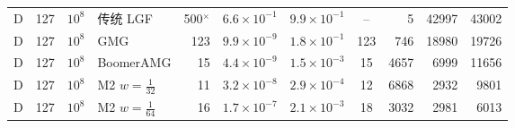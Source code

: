 \begin{longtable}{lrrlrcccrrr}
D & 127 & $10^{8}$ & 传统 LGF & 500$^\times$ & $6.6{\times}10^{-1}$ & $9.9{\times}10^{-1}$ & -- & 5 & 42997 & 43002 \\
D & 127 & $10^{8}$ & GMG & 123 & $9.9{\times}10^{-9}$ & $1.8{\times}10^{-1}$ & 123 & 746 & 18980 & 19726 \\
D & 127 & $10^{8}$ & BoomerAMG & 15 & $4.4{\times}10^{-9}$ & $1.5{\times}10^{-3}$ & 15 & 4657 & 6999 & 11656 \\
D & 127 & $10^{8}$ & M2 $w{=}\frac1{32}$ & 11 & $3.2{\times}10^{-8}$ & $2.9{\times}10^{-4}$ & 12 & 6868 & 2932 & 9801 \\
D & 127 & $10^{8}$ & M2 $w{=}\frac1{64}$ & 16 & $1.7{\times}10^{-7}$ & $2.1{\times}10^{-3}$ & 18 & 3032 & 2981 & 6013 \\
\bottomrule
\end{longtable}
\endgroup